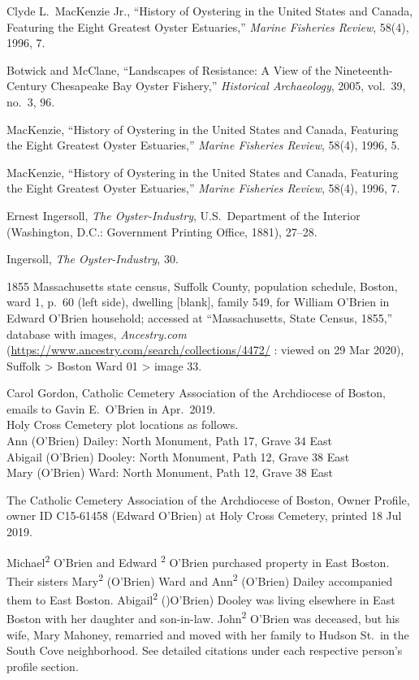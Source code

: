 \begin{thebibliography}{999}
Clyde L.\ MacKenzie Jr., ``History of Oystering in the United States and Canada, Featuring the Eight Greatest Oyster Estuaries,'' \textit{Marine Fisheries Review}, 58(4), 1996, 7.

Botwick and McClane, ``Landscapes of Resistance: A View of the Nineteenth-Century Chesapeake Bay Oyster Fishery,''  \textit{Historical Archaeology}, 2005, vol.\ 39, no.\ 3, 96.

MacKenzie, ``History of Oystering in the United States and Canada, Featuring the Eight Greatest Oyster Estuaries,'' \textit{Marine Fisheries Review}, 58(4), 1996, 5. 

MacKenzie, ``History of Oystering in the United States and Canada, Featuring the Eight Greatest Oyster Estuaries,'' \textit{Marine Fisheries Review}, 58(4), 1996, 7.

Ernest Ingersoll, \textit{The Oyster-Industry}, U.S.\ Department of the Interior (Washington, D.C.: Government Printing Office, 1881), 27--28.

Ingersoll, \textit{The Oyster-Industry}, 30.

1855 Massachusetts state census, Suffolk County, population schedule, Boston, ward 1, p.\ 60 (left side), dwelling [blank], family 549, for William O'Brien in Edward O'Brien household; accessed at ``Massachusetts, State Census, 1855,'' database with images, \textit{Ancestry.com} (\url{https://www.ancestry.com/search/collections/4472/} : viewed on 29 Mar 2020), Suffolk > Boston Ward 01 > image 33.

Carol Gordon, Catholic Cemetery Association of the Archdiocese of Boston, emails to Gavin E.\ O'Brien in Apr.\ 2019.\\
Holy Cross Cemetery plot locations as follows.\\
Ann (O’Brien) Dailey: North Monument, Path 17, Grave 34 East\\
Abigail (O’Brien) Dooley: North Monument, Path 12, Grave 38 East\\
Mary (O’Brien) Ward: North Monument, Path 12, Grave 38 East

The Catholic Cemetery Association of the Archdiocese of Boston, Owner Profile, owner ID C15-61458 (Edward O'Brien) at Holy Cross Cemetery, printed 18 Jul 2019.

Michael\textsuperscript{2} O'Brien and Edward \textsuperscript{2} O'Brien purchased property in East Boston. Their sisters Mary\textsuperscript{2} (O'Brien) Ward and Ann\textsuperscript{2} (O'Brien) Dailey accompanied them to East Boston. Abigail\textsuperscript{2} ()O'Brien) Dooley was living elsewhere in East Boston with her daughter and son-in-law. John\textsuperscript{2} O'Brien was deceased, but his wife, Mary Mahoney, remarried and moved with her family to Hudson St.\ in the South Cove neighborhood. See detailed citations under each respective person's profile section.


\end{thebibliography}
